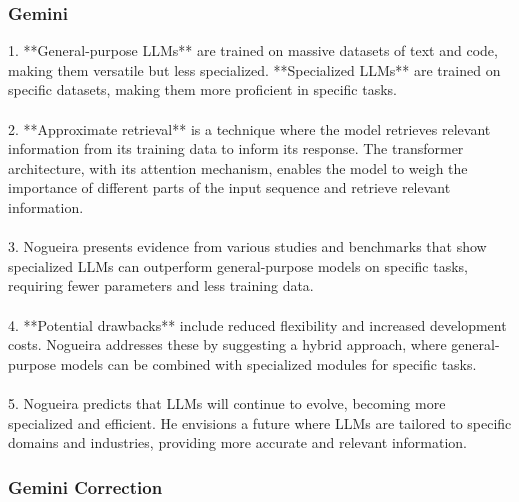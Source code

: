 \subsubsection{Gemini}
\begin{tcolorbox}[breakable]
1. **General-purpose LLMs** are trained on massive datasets of text and code, making them versatile but less specialized. **Specialized LLMs** are trained on specific datasets, making them more proficient in specific tasks.\\
\\
2. **Approximate retrieval** is a technique where the model retrieves relevant information from its training data to inform its response. The transformer architecture, with its attention mechanism, enables the model to weigh the importance of different parts of the input sequence and retrieve relevant information.\\
\\
3. Nogueira presents evidence from various studies and benchmarks that show specialized LLMs can outperform general-purpose models on specific tasks, requiring fewer parameters and less training data.\\
\\
4. **Potential drawbacks** include reduced flexibility and increased development costs. Nogueira addresses these by suggesting a hybrid approach, where general-purpose models can be combined with specialized modules for specific tasks.\\
\\
5. Nogueira predicts that LLMs will continue to evolve, becoming more specialized and efficient. He envisions a future where LLMs are tailored to specific domains and industries, providing more accurate and relevant information.\\
\end{tcolorbox}
\subsubsection{Gemini Correction}
\begin{tcolorbox}[breakable]
    
\end{tcolorbox}

